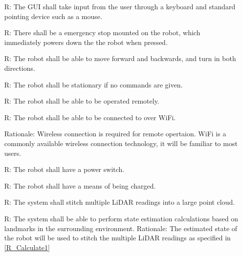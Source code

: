 \documentclass[12pt]{article}
\newcounter{reqnum} %
\begin{document}
\noindent \begin{itemize}

\item[R\refstepcounter{reqnum}\thereqnum \label{R_Inputs1}:] The GUI shall take input from the user through a keyboard and standard pointing device such as a mouse.
\item[R\refstepcounter{reqnum}\thereqnum \label{R_Inputs2}:] There shall be a emergency stop mounted on the robot, which immediately powers down the the robot when pressed.
\item[R\refstepcounter{reqnum}\thereqnum \label{R_Inputs3}:] The robot shall be able to move forward and backwards, and turn in both directions.
\item[R\refstepcounter{reqnum}\thereqnum \label{R_Inputs4}:] The robot shall be stationary if no commands are given.
\item[R\refstepcounter{reqnum}\thereqnum \label{R_Inputs5}:] The robot shall be able to be operated remotely.
\item[R\refstepcounter{reqnum}\thereqnum \label{R_Inputs6}:] The robot shall be able to be connected to over WiFi.
\item[\newline Rationale: Wireless connection is required for remote opertaion. WiFi is a commonly available wireless connection technology, it will be familiar to most users.] 
\item[R\refstepcounter{reqnum}\thereqnum \label{R_Inputs7}:] The robot shall have a power switch.
\item[R\refstepcounter{reqnum}\thereqnum \label{R_Inputs8}:] The robot shall have a means of being charged.

\item[R\refstepcounter{reqnum}\thereqnum \label{R_Calculate1}:] The system shall stitch multiple LiDAR readings into a large point cloud.
\item[R\refstepcounter{reqnum}\thereqnum \label{R_Calculate2}:] The system shall be able to perform state estimation calculations based on landmarks in the surrounding environment.
\newline Rationale: The estimated state of the robot will be used to stitch the multiple LiDAR readings as specified in \ref{R_Calculate1} 


\end{itemize}
\end{document}
